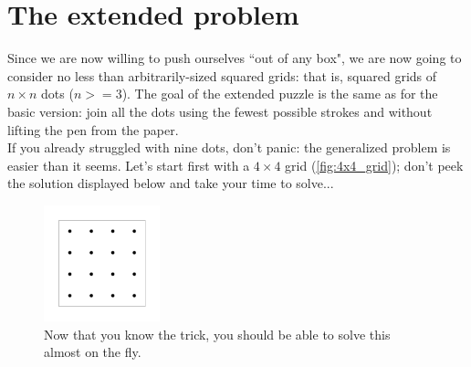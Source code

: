 \documentclass[11pt]{article}
\begin{document}
\hypertarget{the-extended-problem} {
	\section{The extended problem}
	\label{the-extended-problem}
}

Since we are now willing to push ourselves ``out of any box", we are now going to consider no less than arbitrarily-sized squared grids: that is, squared grids of $n \times n$ dots ($n >=3$). The goal of the extended puzzle is the same as for the basic version: join all the dots using the fewest possible strokes and without lifting the pen from the paper.\\
If you already struggled with nine dots, don't panic: the generalized problem is easier than it seems. Let's start first with a $4 \times 4$ grid (\autoref{fig:4x4_grid}); don't peek the solution displayed below and take your time to solve...
\begin{figure}[H]
\centering
\includegraphics[width=0.3\textwidth]{images/4x4_grid.png}
\caption{Now that you know the trick, you should be able to solve this almost on the fly.}
\label{fig:4x4_grid}
\end{figure}
\end{document}
